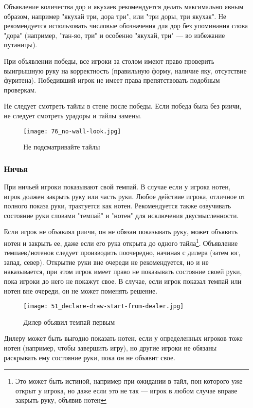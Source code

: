 Объявление количества дор и якухаев рекомендуется делать максимально явным образом, например "якухай три, дора три", или "три доры, три якухая". Не рекомендуется использовать числовые обозначения для дор без упоминания слова "дора" (например, "тан-яо, три" и особенно "якухай, три" --- во избежание путаницы).

При объявлении победы, все игроки за столом имеют право проверить выигрышную руку на корректность (правильную форму, наличие яку, отсутствие фуритена). Победивший игрок не имеет права препятствовать подобным проверкам.

Не следует смотреть тайлы в стене после победы. Если победа была без риичи, не следует смотреть урадоры и тайлы замены. 

\begin{figure}[H]
	\centering
	\texttt{[image: 76\_no-wall-look.jpg]}
	\caption{Не подсматривайте тайлы}
\end{figure}

\subsubsection{Ничья}

При ничьей игроки показывают свой темпай. В случае если у игрока нотен, игрок должен закрыть руку или часть руки. Любое действие игрока, отличное от полного показа руки, трактуется как нотен. Рекомендуется также озвучивать состояние руки словами "темпай" и "нотен" для исключения двусмысленности.

Если игрок не объявлял риичи, он не обязан показывать руку, может объявить нотен и закрыть ее, даже если его рука открыта до одного тайла\footnote{Это может быть истиной, например при ожидании в тайл, пон которого уже открыт у игрока, но даже если это не так --- игрок в любом случае вправе закрыть руку, объявив нотен}. Объявление темпаев/нотенов следует производить поочередно, начиная с дилера (затем юг, запад, север). Открытие руки вне очереди не рекомендуется, но и не наказывается, при этом игрок имеет право не показывать состояние своей руки, пока игроки до него не покажут свое. В случае, если игрок показал темпай или нотен вне очереди, он не может поменять решение.

\begin{figure}[H]
	\centering
	\texttt{[image: 51\_declare-draw-start-from-dealer.jpg]}
	\caption{Дилер объявил темпай первым}
\end{figure}

Дилеру может быть выгодно показать нотен, если у определенных игроков тоже нотен (например, чтобы завершить игру), но другие игроки не обязаны раскрывать ему состояние руки, пока он не объявит свое.


